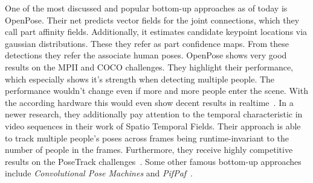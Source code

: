 \begin{flushleft}
    One of the most discussed and popular bottom-up approaches as of today is OpenPose.
    Their net predicts vector fields for the joint connections, which they call part affinity fields.
    Additionally, it estimates candidate keypoint locations via gaussian distributions.
    These they refer as part confidence maps.
    From these detections they refer the associate human poses.
    OpenPose shows very good results on the MPII and COCO challenges.
    They highlight their performance, which especially shows it's strength when detecting multiple people.
    The performance wouldn't change even if more and more people enter the scene.
    With the according hardware this would even show decent results in realtime~\cite{openpose}.
    In a newer research, they additionally pay attention to the temporal characteristic in video sequences in
    their work of Spatio Temporal Fields.
    Their approach is able to track multiple people's poses across frames being runtime-invariant to the number
    of people in the frames.
    Furthermore, they receive highly competitive results on the PoseTrack challenges~\cite{staf}.
    Some other famous bottom-up approaches include \textit{Convolutional Pose Machines} and
    \textit{PifPaf}~\cite{convpose, pifpaf}.
\end{flushleft}
